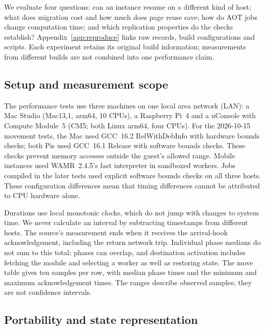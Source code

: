 
We evaluate four questions: can an instance resume on a different kind
of host; what does migration cost and how much does page reuse save;
how do AOT jobs change computation time; and which replication properties
do the checks establish? Appendix~\ref{app:reproduce} links raw records,
build configurations and scripts. Each experiment retains its original
build information; measurements from different builds are not combined
into one performance claim.

\subsection{Setup and measurement scope}\label{sec:evaluation-setup}

The performance tests use three machines on one local area network (LAN):
a Mac Studio (Mac13,1, arm64, 10 CPUs), a Raspberry Pi~4 and a uConsole
with Compute Module~5 (CM5; both Linux arm64, four CPUs). For the
2026-10-15 movement tests, the Mac used GCC~16.2 RelWithDebInfo with
hardware bounds checks; both Pis used GCC~16.1 Release with software
bounds checks. These checks prevent memory accesses outside the guest's
allowed range. Mobile instances used WAMR~2.4.5's fast interpreter in
sandboxed workers. Jobs compiled in the later tests used explicit
software bounds checks on all three hosts. These configuration differences
mean that timing differences cannot be attributed to CPU hardware alone.

Durations use local monotonic clocks, which do not jump with changes
to system time. We never calculate an interval by subtracting timestamps
from different hosts. The source's measurement ends when it receives the
arrival-hook acknowledgement, including the return network trip.
Individual phase medians do not sum to this total: phases can overlap,
and destination activation includes fetching the module and selecting a
worker as well as restoring state. The move table gives ten samples per
row, with median phase times and the minimum and maximum acknowledgement
times. The ranges describe observed samples; they are not confidence
intervals.

\subsection{Portability and state representation}\label{sec:evaluation-images}

